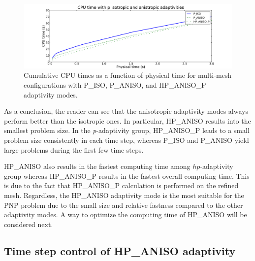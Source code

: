 \begin{figure}[!ht]
  \begin{centering}
  \includegraphics[width=\columnwidth]{isoanisop_cpu}
  \caption{\label{fig:isoanisopcpu} Cumulative CPU times as a function of physical time
  for multi-mesh configurations with P\_ISO, P\_ANISO, and
  HP\_ANISO\_P adaptivity modes.}
  \end{centering}
\end{figure}

As a conclusion, the reader can see that the anisotropic adaptivity modes always perform better than 
the isotropic ones. In particular, HP\_ANISO results into the smallest problem size. 
In the \emph{p}-adaptivity group, HP\_ANISO\_P leads to a small problem size
consistently in each time step, whereas P\_ISO and P\_ANISO yield large problems
during the first few time steps. 

HP\_ANISO also results in the fastest
computing time among $hp$-adaptivity group whereas HP\_ANISO\_P
results in the fastest overall computing time. This is due to the fact
that HP\_ANISO\_P calculation is performed on the refined mesh. 
Regardless, the HP\_ANISO adaptivity mode is the most suitable
for the PNP problem due to the small size and relative fastness compared
to the other adaptivity modes. A way to optimize the computing time
of HP\_ANISO will be considered next.

\subsection{Time step control of HP\_ANISO adaptivity}

